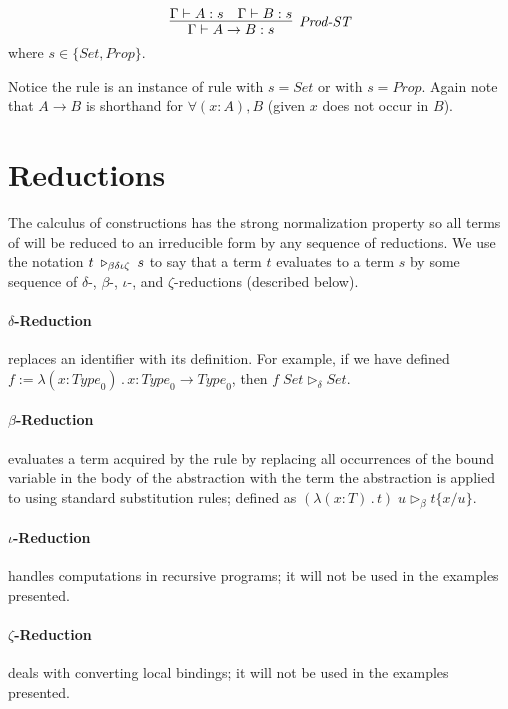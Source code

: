 $$
\infer[\rl{Prod-ST}]{\seq{A \rightarrow B} : s}{\seq{A : s} & \seq{B : s}} 
$$
where $s \in \{ \mathit{Set}, \mathit{Prop} \}$.

Notice the rule  is an instance of rule  with $s = \mathit{Set}$ or  with $s = \mathit{Prop}$. Again note that $A \rightarrow B$ is shorthand for $\forall (x : A), B$ (given $x$ does not occur in $B$).


\section{Reductions}
\label{sec:reductions}

The calculus of constructions has the strong normalization property so all terms of \coc{} will be reduced to an irreducible form by any sequence of reductions. We use the notation $t \; \triangleright_{\beta\delta\iota\zeta} \;{} s$ to say that a term $t$ evaluates to a term $s$ by some sequence of $\delta$-, $\beta$-, $\iota$-, and $\zeta$-reductions (described below).

\paragraph{$\delta$-Reduction} replaces an identifier with its definition. For example, if we have defined $f := \lambda (x : \mathit{Type}_0) \, . \, x : \mathit{Type}_0 \rightarrow \mathit{Type}_0$, then $f \; \mathit{Set} \triangleright_{\delta} \mathit{Set}$.

\paragraph{$\beta$-Reduction} evaluates a term acquired by the  rule by replacing all occurrences of the bound variable in the body of the abstraction with the term the abstraction is applied to using standard substitution rules; defined as $(\lambda (x : T) \, . \, t) \; u \triangleright_\beta t \{ x / u \}$.

\paragraph{$\iota$-Reduction} handles computations in recursive programs; it will not be used in the examples presented.

\paragraph{$\zeta$-Reduction} deals with converting local bindings; it will not be used in the examples presented.

